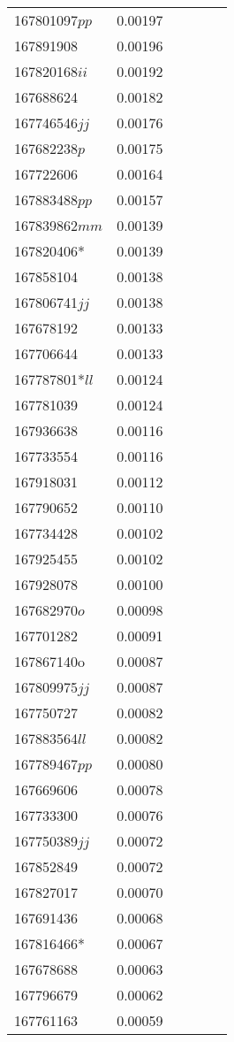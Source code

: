 \begin{landscape}
\begin{longtable}{p{1.6cm}p{1.2cm}p{1.5cm}p{1.5cm}p{2.8cm}p{13.5cm}}
167801097$pp$&0.00197&&&& \\
167891908&0.00196&&&& \\
167820168$ii$&0.00192&&&& \\
167688624&0.00182&&&& \\
167746546$jj$&0.00176&&&& \\
167682238$p$&0.00175&&&& \\
167722606&0.00164&&&& \\
167883488$pp$&0.00157&&&& \\
167839862$mm$&0.00139&&&& \\
167820406*&0.00139&&&& \\
167858104&0.00138&&&& \\
167806741$jj$&0.00138&&&& \\
167678192&0.00133&&&& \\
167706644&0.00133&&&& \\
167787801*$ll$&0.00124&&&& \\
167781039&0.00124&&&& \\
167936638&0.00116&&&& \\
167733554&0.00116&&&& \\
167918031&0.00112&&&& \\
167790652&0.00110&&&& \\
167734428&0.00102&&&& \\
167925455&0.00102&&&& \\
167928078&0.00100&&&& \\
167682970$o$&0.00098&&&& \\
167701282&0.00091&&&& \\
167867140o&0.00087&&&& \\
167809975$jj$&0.00087&&&& \\
167750727&0.00082&&&& \\
167883564$ll$&0.00082&&&& \\
167789467$pp$&0.00080&&&& \\
167669606&0.00078&&&& \\
167733300&0.00076&&&& \\
167750389$jj$&0.00072&&&& \\
167852849&0.00072&&&& \\
167827017&0.00070&&&& \\
167691436&0.00068&&&& \\
167816466*&0.00067&&&& \\
167678688&0.00063&&&& \\
167796679&0.00062&&&& \\
167761163&0.00059&&&& \\

\end{longtable}
\end{landscape}
